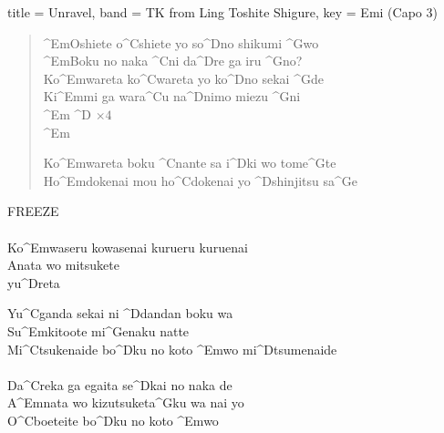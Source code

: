 \begin{song}[
	remember-chords = false ,
	verse/numbered = true ,
	transpose-capo = true 
	]{
		title = Unravel,
		band = TK from Ling Toshite Shigure,
		key  = Emi
	}	
	(Capo 3)
	\begin{verse}
		
		^{Em}Oshiete o^{C}shiete yo so^{D}no shikumi ^{G}wo \\
		^{Em}Boku no naka ^{C}ni da^{D}re ga iru ^{G}no? \\
		Ko^{Em}wareta ko^{C}wareta yo ko^{D}no sekai ^{G}de \\
		Ki^{Em}mi ga wara^{C}u na^{D}nimo miezu ^{G}ni \\
		
		^{Em} ^{D} $\times{4}$ \\
		^{Em} 
		
		Ko^{Em}wareta boku ^{C}nante sa i^{D}ki wo tome^{G}te \\
		Ho^{Em}dokenai mou ho^{C}dokenai yo ^{D}shinjitsu sa^{G}e 
	
	\end{verse}
	\begin{bridge}
		
		FREEZE \\
		 \\
		Ko^{Em}waseru kowasenai kurueru kuruenai \\
		Anata wo mitsukete \\
		yu^{D}reta \\
		
	\end{bridge}
	\begin{chorus}
		
		Yu^{C}ganda sekai ni ^{D}dandan boku wa \\
		Su^{Em}kitoote mi^{G}enaku natte \\
		Mi^{C}tsukenaide bo^{D}ku no koto ^{Em}wo mi^{D}tsumenaide \\
		\\
		Da^{C}reka ga egaita se^{D}kai no naka de \\
		A^{Em}nata wo kizutsuketa^{G}ku wa nai yo \\
		O^{C}boeteite bo^{D}ku no koto ^{Em}wo \\
	
	\end{chorus}
		
\end{song}